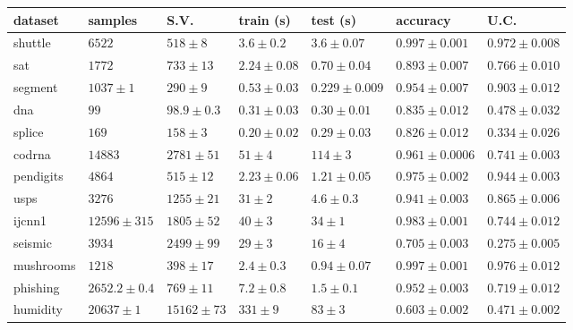 \begin{tabular}{|l|llllll|}
\hline
dataset & samples & S.V. & train (s) & test (s) & accuracy & U.C. \\
\hline
shuttle  & $    6522$ & $         518\pm      8$ & $        3.6\pm      0.2$ & $        3.6\pm    0.07$ & $       0.997\pm  0.001$ & $       0.972\pm   0.008$\\
sat  & $    1772$ & $         733\pm       13$ & $        2.24\pm    0.08$ & $       0.70\pm    0.04$ & $       0.893\pm   0.007$ & $       0.766\pm     0.010$\\
segment  & $    1037\pm     1$ & $         290\pm        9$ & $       0.53\pm    0.03$ & $       0.229\pm   0.009$ & $       0.954\pm   0.007$ & $       0.903\pm    0.012$\\
dna  & $          99$ & $        98.9\pm     0.3$ & $       0.31\pm    0.03$ & $       0.30\pm    0.01$ & $       0.835\pm    0.012$ & $       0.478\pm    0.032$\\
splice  & $         169$ & $         158\pm      3$ & $         0.20\pm    0.02$ & $       0.29\pm     0.03$ & $       0.826\pm    0.012$ & $       0.334\pm    0.026$\\
codrna  & $    14883$ & $    2781\pm       51$ & $        51\pm      4$ & $         114\pm      3$ & $       0.961\pm  0.0006$ & $       0.741\pm   0.003$\\
pendigits  & $    4864$ & $         515\pm       12$ & $        2.23\pm    0.06$ & $        1.21\pm    0.05$ & $       0.975\pm   0.002$ & $       0.944\pm   0.003$\\
usps  & $    3276$ & $    1255\pm       21$ & $        31\pm      2$ & $        4.6\pm     0.3$ & $       0.941\pm   0.003$ & $       0.865\pm   0.006$\\
ijcnn1  & $    12596\pm  315$ & $    1805\pm       52$ & $          40\pm      3$ & $          34\pm      1$ & $       0.983\pm   0.001$ & $       0.744\pm    0.012$\\
seismic  & $    3934$ & $     2499\pm       99$ & $        29\pm      3$ & $        16\pm      4$ & $       0.705\pm   0.003$ & $       0.275\pm   0.005$\\
mushrooms  & $    1218$ & $         398\pm       17$ & $         2.4\pm     0.3$ & $       0.94\pm    0.07$ & $       0.997\pm   0.001$ & $       0.976\pm    0.012$\\
phishing  & $    2652.2\pm     0.4$ & $         769\pm       11$ & $        7.2\pm     0.8$ & $        1.5\pm     0.1$ & $       0.952\pm   0.003$ & $       0.719\pm    0.012$\\
humidity  & $    20637\pm     1$ & $    15162\pm       73$ & $         331\pm        9$ & $        83\pm      3$ & $       0.603\pm   0.002$ & $       0.471\pm    0.002$\\
\hline
\end{tabular}

